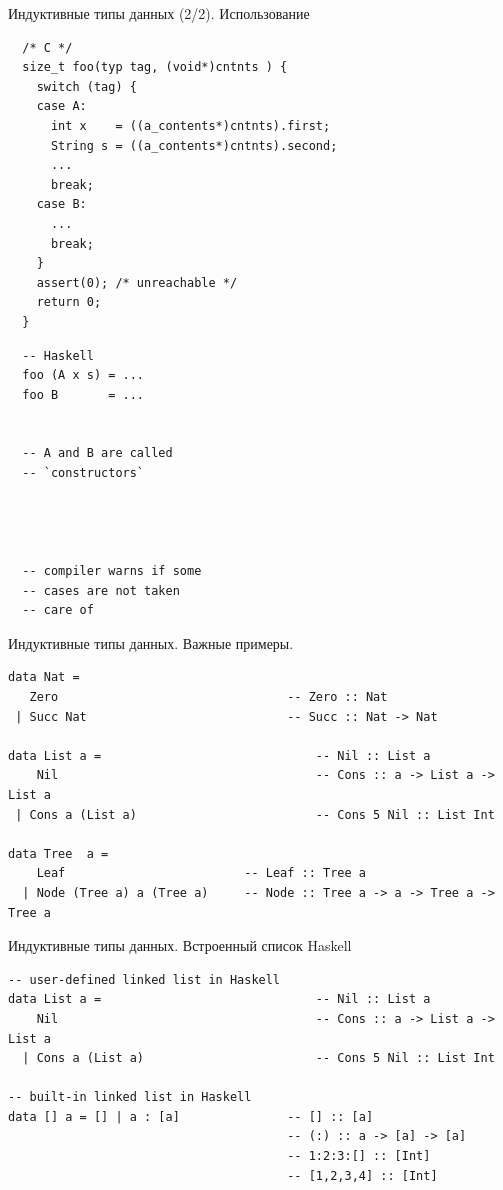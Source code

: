 \documentclass[aspectratio=169
  , xcolor={svgnames}
  , hyperref={ colorlinks,citecolor=DeepPink4
             , linkcolor=DarkRed,urlcolor=DarkBlue}
  , russian
  ]{beamer}
\theoremstyle{exerciseStyle1}
\begin{document}
\begin{frame}[fragile]{Индуктивные типы данных (2/2). Использование}


\begin{minipage}{.65\textwidth}
  \begin{verbatim}
  /* C */
  size_t foo(typ tag, (void*)cntnts ) {
    switch (tag) {
    case A: 
      int x    = ((a_contents*)cntnts).first;
      String s = ((a_contents*)cntnts).second;
      ...
      break;
    case B:
      ...
      break;
    }    
    assert(0); /* unreachable */
    return 0;
  }
  \end{verbatim}
\end{minipage}
\begin{minipage}{.3\textwidth}
  \begin{verbatim}
  -- Haskell
  foo (A x s) = ...
  foo B       = ...


  -- A and B are called 
  -- `constructors`
  
  
  
  
  -- compiler warns if some
  -- cases are not taken
  -- care of
  \end{verbatim}
\end{minipage}
\end{frame}

\begin{frame}[fragile]{Индуктивные типы данных. Важные примеры.}
\begin{verbatim}
data Nat = 
   Zero                                -- Zero :: Nat
 | Succ Nat                            -- Succ :: Nat -> Nat

data List a =                              -- Nil :: List a
    Nil                                    -- Cons :: a -> List a -> List a
 | Cons a (List a)                         -- Cons 5 Nil :: List Int

data Tree  a = 
    Leaf                         -- Leaf :: Tree a
  | Node (Tree a) a (Tree a)     -- Node :: Tree a -> a -> Tree a -> Tree a
\end{verbatim}
\end{frame}

\begin{frame}[fragile]{Индуктивные типы данных. Встроенный список Haskell}
\begin{verbatim}
-- user-defined linked list in Haskell
data List a =                              -- Nil :: List a
    Nil                                    -- Cons :: a -> List a -> List a
  | Cons a (List a)                        -- Cons 5 Nil :: List Int

-- built-in linked list in Haskell
data [] a = [] | a : [a]               -- [] :: [a]
                                       -- (:) :: a -> [a] -> [a]
                                       -- 1:2:3:[] :: [Int]
                                       -- [1,2,3,4] :: [Int]
\end{verbatim}
\end{frame}
\end{document}
